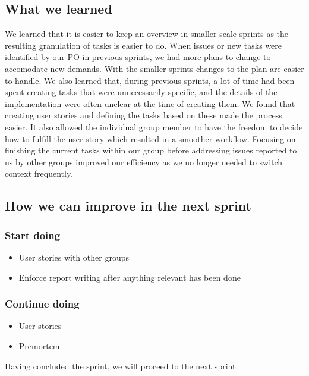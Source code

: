 \subsection{What we learned}
We learned that it is easier to keep an overview in smaller scale sprints as the resulting granulation of tasks is easier to do. When issues or new tasks were identified by our PO in previous sprints, we had more plans to change to accomodate new demands. With the smaller sprints changes to the plan are easier to handle. 
We also learned that, during previous sprints, a lot of time had been spent creating tasks that were unnecessarily specific, and the details of the implementation were often unclear at the time of creating them. We found that creating user stories and defining the tasks based on these made the process easier. It also allowed the individual group member to have the freedom to decide how to fulfill the user story which resulted in a smoother workflow.  
Focusing on finishing the current tasks within our group before addressing issues reported to us by other groups improved our efficiency as we no longer needed to switch context frequently.

\subsection{How we can improve in the next sprint}
\subsubsection{Start doing}
\begin{itemize}
    \item User stories with other groups
    \item Enforce report writing after anything relevant has been done
\end{itemize}
\subsubsection{Continue doing}
\begin{itemize}
    \item User stories
    \item Premortem
\end{itemize}

Having concluded the sprint, we will proceed to the next sprint.
